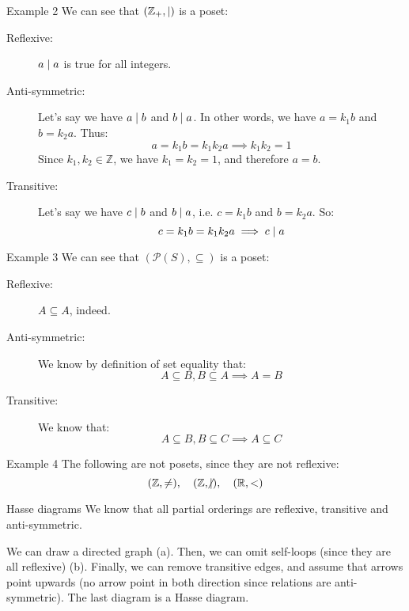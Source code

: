\documentclass[a4paper]{article}
\begin{document}
\begin{parag}{Example 2}
    We can see that $\left(\mathbb{Z}_+, \divides\right)$ is a poset:
    \begin{description}
        \item[Reflexive:] $a \mid a$ is true for all integers.
        \item[Anti-symmetric:] Let's say we have $a \mid b$ and $b \mid a$. In other words, we have $a = k_1 b$ and $b = k_2 a$. Thus:
            \[a = k_1 b = k_1 k_2 a \implies k_1 k_2 = 1\]
            Since $k_1, k_2 \in \mathbb{Z}$, we have $k_1 = k_2 = 1$, and therefore $a = b$.
        \item[Transitive:] Let's say we have $c \mid b$ and $b \mid a$, i.e. $c = k_1 b$ and $b = k_2 a$. So:
            \[c = k_1b = k_1 k_2 a \implies c \mid a\]
    \end{description}
\end{parag}

\begin{parag}{Example 3}
    We can see that $\left(\mathcal{P}\left(S\right), \subseteq\right)$ is a poset:
    \begin{description}
        \item[Reflexive:] $A \subseteq A$, indeed.
        \item[Anti-symmetric:] We know by definition of set equality that:
        \[A \subseteq B, B \subseteq A \implies A = B\]
        \item[Transitive:] We know that:
        \[A \subseteq B, B \subseteq C \implies A \subseteq C\]
    \end{description}
\end{parag}

\begin{parag}{Example 4}
    The following are not posets, since they are not reflexive:
    \[\left(\mathbb{Z}, \neq\right), \mathspace \left(\mathbb{Z}, \ndivides\right), \mathspace \left(\mathbb{R}, <\right)\]
\end{parag}

\begin{parag}{Hasse diagrams}
    We know that all partial orderings are reflexive, transitive and anti-symmetric.

    We can draw a directed graph (a). Then, we can omit self-loops (since they are all reflexive) (b). Finally, we can remove transitive edges, and assume that arrows point upwards (no arrow point in both direction since relations are anti-symmetric). The last diagram is a Hasse diagram.

\end{parag}
\end{document}
